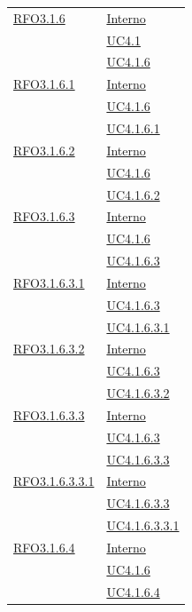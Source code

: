 \begin{longtable}{|>{\centering}m{5cm}|m{5cm}<{\centering}|}
\hyperlink{RFO3.1.6}{RFO3.1.6} & \hyperlink{Interno}{Interno}\\
& \hyperref[UC4.1]{UC4.1}\\
& \hyperref[UC4.1.6]{UC4.1.6}\\ \hline

\hyperlink{RFO3.1.6.1}{RFO3.1.6.1} & \hyperlink{Interno}{Interno}\\
& \hyperref[UC4.1.6]{UC4.1.6}\\
& \hyperref[UC4.1.6.1]{UC4.1.6.1}\\ \hline

\hyperlink{RFO3.1.6.2}{RFO3.1.6.2} & \hyperlink{Interno}{Interno}\\
& \hyperref[UC4.1.6]{UC4.1.6}\\
& \hyperref[UC4.1.6.2]{UC4.1.6.2}\\ \hline

\hyperlink{RFO3.1.6.3}{RFO3.1.6.3} & \hyperlink{Interno}{Interno}\\
& \hyperref[UC4.1.6]{UC4.1.6}\\
& \hyperref[UC4.1.6.3]{UC4.1.6.3}\\ \hline

\hyperlink{RFO3.1.6.3.1}{RFO3.1.6.3.1} & \hyperlink{Interno}{Interno}\\
& \hyperref[UC4.1.6.3]{UC4.1.6.3}\\
& \hyperref[UC4.1.6.3.1]{UC4.1.6.3.1}\\ \hline

\hyperlink{RFO3.1.6.3.2}{RFO3.1.6.3.2} & \hyperlink{Interno}{Interno}\\
& \hyperref[UC4.1.6.3]{UC4.1.6.3}\\
& \hyperref[UC4.1.6.3.2]{UC4.1.6.3.2}\\ \hline

\hyperlink{RFO3.1.6.3.3}{RFO3.1.6.3.3} & \hyperlink{Interno}{Interno}\\
& \hyperref[UC4.1.6.3]{UC4.1.6.3}\\
& \hyperref[UC4.1.6.3.3]{UC4.1.6.3.3}\\ \hline

\hyperlink{RFO3.1.6.3.3.1}{RFO3.1.6.3.3.1} & \hyperlink{Interno}{Interno}\\
& \hyperref[UC4.1.6.3.3]{UC4.1.6.3.3}\\
& \hyperref[UC4.1.6.3.3.1]{UC4.1.6.3.3.1}\\ \hline

\hyperlink{RFO3.1.6.4}{RFO3.1.6.4} & \hyperlink{Interno}{Interno}\\
& \hyperref[UC4.1.6]{UC4.1.6}\\
& \hyperref[UC4.1.6.4]{UC4.1.6.4}\\ \hline


\end{longtable}
